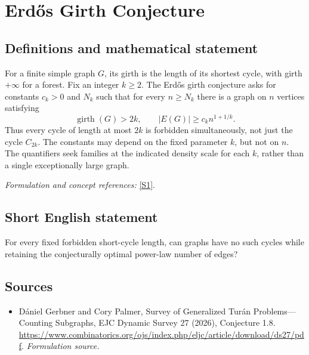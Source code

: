 \documentclass[11pt]{article}
\begin{document}
\section*{\texorpdfstring{Erdős Girth Conjecture}{Erdős Girth Conjecture}}\label{320}
\subsection{Definitions and mathematical statement}
For a finite simple graph $G$, its girth is the length of its shortest cycle, with girth $+\infty$ for a forest. Fix an integer $k\ge2$. The Erd\H{o}s girth conjecture asks for constants $c_k>0$ and $N_k$ such that for every $n\ge N_k$ there is a graph on $n$ vertices satisfying
\[
 \operatorname{girth}(G)>2k,
 \qquad |E(G)|\ge c_k n^{1+1/k}.
\]
Thus every cycle of length at most $2k$ is forbidden simultaneously, not just the cycle $C_{2k}$. The constants may depend on the fixed parameter $k$, but not on $n$. The quantifiers seek families at the indicated density scale for each $k$, rather than a single exceptionally large graph.
\par\smallskip\textit{Formulation and concept references:} \href{https://www.combinatorics.org/ojs/index.php/eljc/article/download/ds27/pdf}{[S1]}.

\subsection{Short English statement}
For every fixed forbidden short-cycle length, can graphs have no such cycles while retaining the conjecturally optimal power-law number of edges?
\subsection{Sources}
\begin{itemize}
\item[S1]Dániel Gerbner and Cory Palmer, Survey of Generalized Turán Problems—Counting Subgraphs, EJC Dynamic Survey 27 (2026), Conjecture 1.8.
\url{https://www.combinatorics.org/ojs/index.php/eljc/article/download/ds27/pdf}.
\textit{Formulation source.}
\end{itemize}
\end{document}
